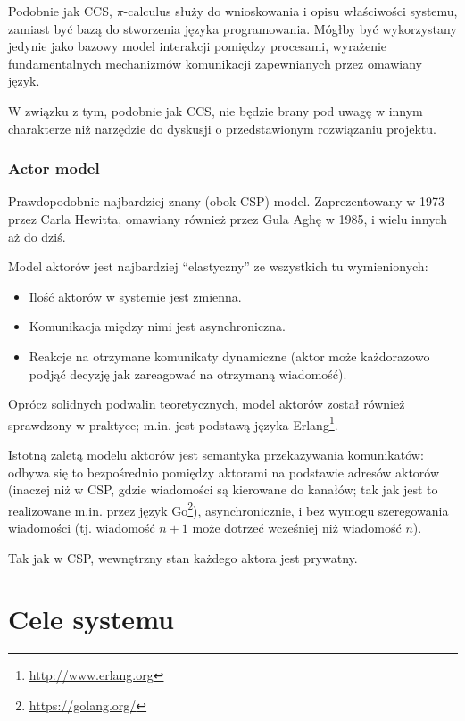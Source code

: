 \documentclass[11pt,oneside,a4paper,titlepage,onecolumn]{article}
\begin{document}
Podobnie jak CCS, $\pi$-calculus służy do wnioskowania i opisu właściwości systemu, zamiast być
bazą do stworzenia języka programowania. Mógłby być wykorzystany jedynie jako bazowy model interakcji
pomiędzy procesami, wyrażenie fundamentalnych mechanizmów komunikacji zapewnianych przez omawiany
język.

W związku z tym, podobnie jak CCS, nie będzie brany pod uwagę w innym charakterze niż narzędzie do
dyskusji o przedstawionym rozwiązaniu projektu.

\subsubsection{Actor model}

Prawdopodobnie najbardziej znany (obok CSP) model. Zaprezentowany w 1973 przez Carla Hewitta, omawiany
również przez Gula Aghę w 1985, i wielu innych aż do dziś.

Model aktorów jest najbardziej ``elastyczny'' ze wszystkich tu wymienionych:

\begin{itemize}
\item Ilość aktorów w systemie jest zmienna.
\item Komunikacja między nimi jest asynchroniczna.
\item Reakcje na otrzymane komunikaty dynamiczne (aktor może każdorazowo podjąć decyzję jak zareagować
    na otrzymaną wiadomość).
\end{itemize}

Oprócz solidnych podwalin teoretycznych, model aktorów został również sprawdzony w praktyce; m.in. jest
podstawą języka Erlang\footnote{\url{http://www.erlang.org}}.

Istotną zaletą modelu aktorów jest semantyka przekazywania komunikatów: odbywa się to bezpośrednio pomiędzy
aktorami na podstawie adresów aktorów (inaczej niż w CSP, gdzie wiadomości są kierowane do kanałów; tak jak
jest to realizowane m.in. przez język Go\footnote{\url{https://golang.org/}}), asynchronicznie, i
bez wymogu szeregowania wiadomości (tj. wiadomość $n+1$ może dotrzeć wcześniej niż wiadomość $n$).

Tak jak w CSP, wewnętrzny stan każdego aktora jest prywatny.


\section{Cele systemu}
\end{document}
